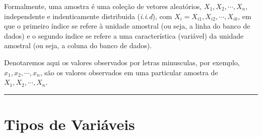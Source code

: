 \documentclass[
]{book}
\begin{document}
Formalmente, uma amostra é uma coleção de vetores aleatórios, \(X_1, X_2, \cdots, X_n\), independente e indenticamente distribuida (\emph{i.i.d}), com \(X_i = X_{i1}, X_{i2}, \cdots, X_{ik}\), em que o primeiro índice se refere à unidade amostral (ou seja, a linha do banco de dados) e o segundo índice se refere a uma característica (variável) da unidade amostral (ou seja, a coluna do banco de dados).

Denotaremos aqui os valores observados por letras minusculas, por exemplo, \(x_1, x_2, \cdots, x_n\), são os valores observados em uma particular amostra de \(X_1, X_2, \cdots, X_n\).

\begin{center}\rule{0.5\linewidth}{0.5pt}\end{center}

\section{Tipos de Variáveis}\label{tipos-de-variuxe1veis}
\end{document}
